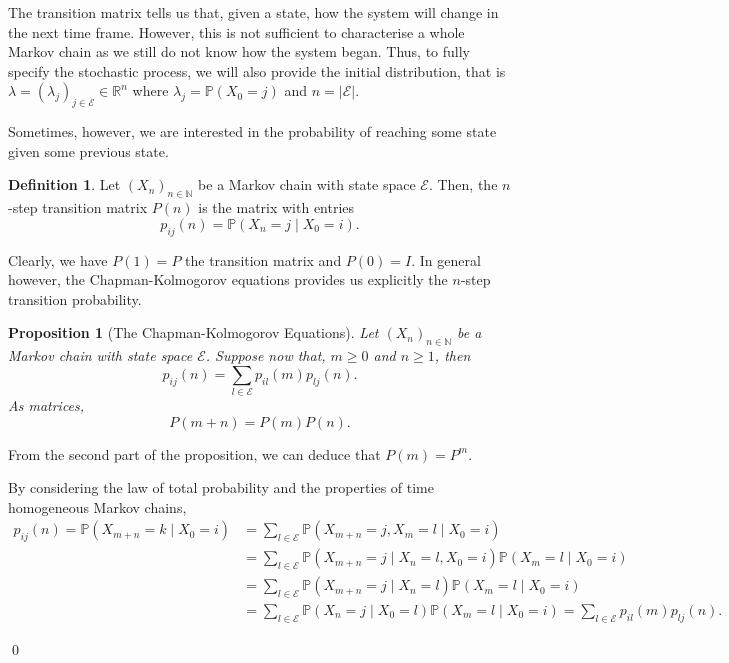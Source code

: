 \documentclass[
]{article}
\newtheorem{prop}{Proposition}[theorem]
\theoremstyle{definition}
\newtheorem{definition}{Definition}[section]
\begin{document}
The transition matrix tells us that, given a state, how the system will
change in the next time frame. However, this is not sufficient to
characterise a whole Markov chain as we still do not know how the system
began. Thus, to fully specify the stochastic process, we will also
provide the initial distribution, that is
\(\lambda = (\lambda_j)_{j \in \mathcal{E}} \in \mathbb{R}^n\) where
\(\lambda_j = \mathbb{P}(X_0 = j)\) and
\(n = \left| \mathcal{E} \right|\).

Sometimes, however, we are interested in the probability of reaching
some state given some previous state.

\begin{definition}
  Let \((X_n)_{n \in \mathbb{N}}\) be a Markov chain with state space \(\mathcal{E}\).
  Then, the \(n\)-step transition matrix \(P(n)\) is the matrix with entries 
  \[p_{ij}(n) = \mathbb{P}(X_n = j \mid X_0 = i).\]
\end{definition}

Clearly, we have \(P(1) = P\) the transition matrix and \(P(0) = I\). In
general however, the Chapman-Kolmogorov equations provides us explicitly
the \(n\)-step transition probability.

\begin{prop}[The Chapman-Kolmogorov Equations]
  Let \((X_n)_{n \in \mathbb{N}}\) be a Markov chain with state space \(\mathcal{E}\). 
  Suppose now that, \(m \ge 0\) and \(n \ge 1\), then 
  \[p_{ij}(n) = \sum_{l \in \mathcal{E}}p_{il}(m)p_{lj}(n).\]
  As matrices,
  \[P(m + n) = P(m) P(n).\] 
\end{prop}

From the second part of the proposition, we can deduce that
\(P(m) = P^m\).

\proof

By considering the law of total probability and the properties of time
homogeneous Markov chains, \begin{align*}
    p_{ij}(n) = \mathbb{P}(X_{m + n} = k \mid X_0 = i) & = 
      \sum_{l \in \mathcal{E}} \mathbb{P}(X_{m + n} = j, X_m = l \mid X_0 = i)\\
    & = \sum_{l \in \mathcal{E}} \mathbb{P}(X_{m + n} = j \mid X_n = l, X_0 = i)
      \mathbb{P}(X_m = l \mid X_0 = i)\\
    & = \sum_{l \in \mathcal{E}} \mathbb{P}(X_{m + n} = j \mid X_n = l)
      \mathbb{P}(X_m = l \mid X_0 = i)\\
    & = \sum_{l \in \mathcal{E}}\mathbb{P}(X_ n = j \mid X_0 = l) 
      \mathbb{P}(X_m = l \mid X_0 = i) = \sum_{l \in \mathcal{E}}p_{il}(m)p_{lj}(n).
  \end{align*}

\qed
\end{document}

